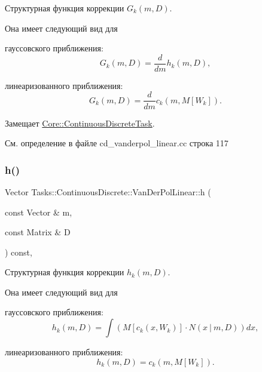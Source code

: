 Структурная функция коррекции $G_k(m, D)$. 

Она имеет следующий вид для


\begin{DoxyItemize}
\item гауссовского приближения\+: \[G_k(m, D) = \frac{d}{dm}h_k(m,D),\]
\item линеаризованного приближения\+: \[G_k(m, D) = \frac{d}{dm}c_k(m,M[W_k]).\] 
\end{DoxyItemize}

Замещает \hyperlink{class_core_1_1_continuous_discrete_task_a2bc6d34d112ec0999857f7f9e0f67dda}{Core\+::\+Continuous\+Discrete\+Task}.



См. определение в файле cd\+\_\+vanderpol\+\_\+linear.\+cc строка 117

\hypertarget{class_tasks_1_1_continuous_discrete_1_1_van_der_pol_linear_a2a3ca4ebc2e8c458fbea40e854f375ec}{}\label{class_tasks_1_1_continuous_discrete_1_1_van_der_pol_linear_a2a3ca4ebc2e8c458fbea40e854f375ec} 
\subsubsection{\texorpdfstring{h()}{h()}}
{\footnotesize\ttfamily Vector Tasks\+::\+Continuous\+Discrete\+::\+Van\+Der\+Pol\+Linear\+::h (\begin{DoxyParamCaption}\item[{const Vector \&}]{m,  }\item[{const Matrix \&}]{D }\end{DoxyParamCaption}) const\hspace{0.3cm}{\ttfamily [override]}, {\ttfamily [virtual]}}



Структурная функция коррекции $h_k(m, D)$. 

Она имеет следующий вид для


\begin{DoxyItemize}
\item гауссовского приближения\+: \[h_k(m, D) = \int (M[c_k(x, W_k)] \cdot N(x\ |\ m, D))dx,\]
\item линеаризованного приближения\+: \[h_k(m, D) = c_k(m, M[W_k]).\] 
\end{DoxyItemize}

